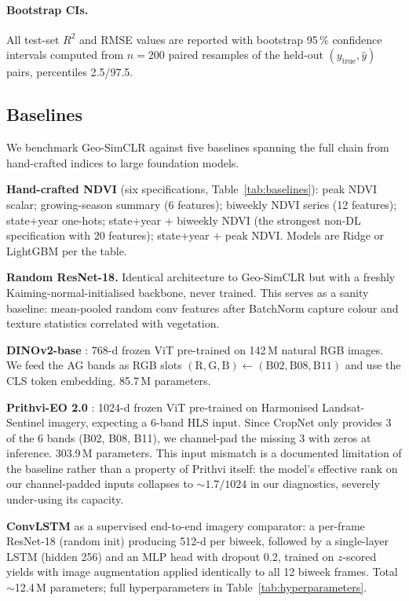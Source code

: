 \documentclass{article}
\begin{document}
\paragraph{Bootstrap CIs.}
All test-set $R^2$ and RMSE values are reported with bootstrap 95\,\%
confidence intervals computed from $n=200$ paired resamples of the held-out
$(y_{\text{true}}, \widehat y)$ pairs, percentiles 2.5/97.5.

\subsection{Baselines}
\label{sec:methods-baselines}
We benchmark Geo-SimCLR against five baselines spanning the full chain from
hand-crafted indices to large foundation models.

\textbf{Hand-crafted NDVI} (six specifications, Table~\ref{tab:baselines}):
peak NDVI scalar; growing-season summary (6 features); biweekly NDVI series
(12 features); state+year one-hots; state+year + biweekly NDVI (the strongest
non-DL specification with 20 features); state+year + peak NDVI.
Models are Ridge or LightGBM per the table.

\textbf{Random ResNet-18.} Identical architecture to Geo-SimCLR but with a
freshly Kaiming-normal-initialised backbone, never trained. This serves as a
sanity baseline: mean-pooled random conv features after BatchNorm capture
colour and texture statistics correlated with vegetation.

\textbf{DINOv2-base} \citep{oquab2024dinov2}: 768-d frozen ViT pre-trained on
142\,M natural RGB images. We feed the AG bands as RGB slots
$(\text{R}, \text{G}, \text{B}) \leftarrow (\text{B02}, \text{B08}, \text{B11})$
and use the CLS token embedding. 85.7\,M parameters.

\textbf{Prithvi-EO 2.0} \citep{jakubik2023prithvi}: 1024-d frozen ViT
pre-trained on Harmonised Landsat-Sentinel imagery, expecting a 6-band HLS
input. Since CropNet only provides 3 of the 6 bands (B02, B08, B11), we
channel-pad the missing 3 with zeros at inference. 303.9\,M parameters.
This input mismatch is a documented limitation of the baseline rather than a
property of Prithvi itself: the model's effective rank on our channel-padded
inputs collapses to $\sim 1.7 / 1024$ in our diagnostics, severely
under-using its capacity.

\textbf{ConvLSTM} \citep{shi2015convlstm} as a supervised end-to-end imagery
comparator: a per-frame ResNet-18 (random init) producing 512-d per biweek,
followed by a single-layer LSTM (hidden 256) and an MLP head with dropout 0.2,
trained on $z$-scored yields with image augmentation applied identically to all
12 biweek frames. Total $\sim$12.4\,M parameters; full hyperparameters in
Table~\ref{tab:hyperparameters}.
\end{document}
